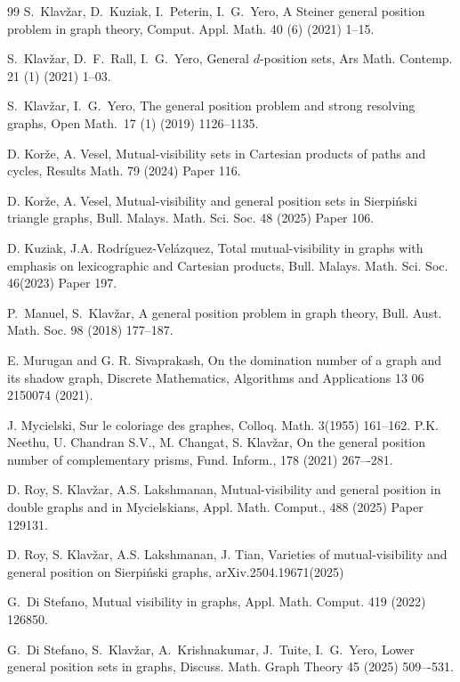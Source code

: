\documentclass[a4paper,12pt]{article}
\begin{document}
{\begin{thebibliography}{99}
    S.~Klav\v zar, D.~Kuziak, I.~Peterin, I.~G.~Yero, A Steiner general position problem in graph theory, Comput. Appl. Math. 40 (6) (2021) 1--15.

  
    S.~Klav\v zar, D.~F.~Rall, I.~G.~Yero, General $d$-position sets, Ars Math. Contemp. 21 (1) (2021) 1--03.
 

  S.~Klav\v{z}ar, I.~G.~Yero, The general position problem and strong resolving graphs, Open Math.\ 17 (1) (2019) 1126--1135.

  D. Korže, A. Vesel, Mutual-visibility sets in Cartesian products of paths and cycles, Results Math. 79 (2024) Paper 116.

  D. Korže, A. Vesel, Mutual-visibility and general position sets in Sierpiński triangle graphs, Bull. Malays. Math. Sci. Soc. 48 (2025) Paper 106.

 \bibitem{} D. Kuziak, J.A. Rodríguez-Velázquez, Total mutual-visibility in graphs with emphasis on lexicographic and Cartesian products, Bull. Malays. Math. Sci. Soc. 46(2023) Paper 197.

    P.~Manuel, S.~Klav\v{z}ar, A general position problem in graph theory,  Bull. Aust. Math. Soc. 98 (2018) 177--187. 

 
 
 E. Murugan and G. R. Sivaprakash, On the domination number of a graph and its shadow graph, Discrete Mathematics, Algorithms and Applications 13 06 2150074 (2021).

 J. Mycielski, Sur le coloriage des graphes, Colloq. Math. 3(1955) 161--162. 
 P.K. Neethu, U. Chandran S.V., M. Changat, S. Klavžar, On the general position number of complementary prisms, Fund. Inform., 178 (2021) 267–-281.

 D. Roy, S. Klavžar, A.S. Lakshmanan, Mutual-visibility and general position in double graphs and in Mycielskians, Appl. Math. Comput., 488 (2025) Paper 129131.


 D. Roy, S. Klavžar, A.S. Lakshmanan, J. Tian, Varieties of mutual-visibility and general position on Sierpi\'nski graphs, arXiv.2504.19671(2025)



 G.~Di Stefano, Mutual visibility in graphs, Appl. Math. Comput. 419 (2022) 126850.


 G.~Di Stefano, S.~Klav\v{z}ar, A.~Krishnakumar, J.~Tuite, I.~G.~Yero, Lower general position sets in graphs, Discuss. Math. Graph Theory 45 (2025) 509–-531.




\end{thebibliography}}
\end{document}
